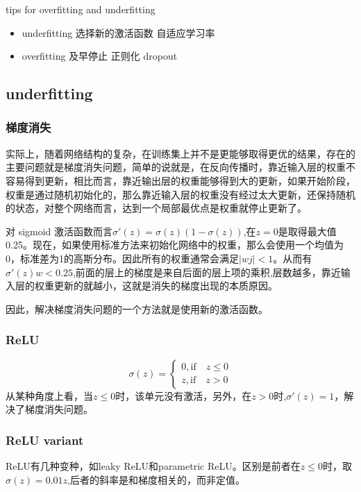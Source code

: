 \begin{myquotation}{tips for overfitting and underfitting}
	
\begin{itemize}
	\item underfitting
		\subitem	选择新的激活函数
		\subitem 	自适应学习率
	\item overfitting
		\subitem	及早停止
		\subitem	正则化
		\subitem	dropout 
\end{itemize}
	
\end{myquotation}

\subsection{underfitting}

\subsubsection{梯度消失}

实际上，随着网络结构的复杂，在训练集上并不是更能够取得更优的结果，存在的主要问题就是梯度消失问题，简单的说就是，在反向传播时，靠近输入层的权重不容易得到更新，相比而言，靠近输出层的权重能够得到大的更新，如果开始阶段，权重是通过随机初始化的，那么靠近输入层的权重没有经过太大更新，还保持随机的状态，对整个网络而言，达到一个局部最优点是权重就停止更新了。

对 sigmoid 激活函数而言$\sigma ' (z) = \sigma(z)(1-\sigma(z))$,在$z=0$是取得最大值0.25。现在，如果使用标准方法来初始化网络中的权重，那么会使用一个均值为0，标准差为1的高斯分布。因此所有的权重通常会满足$|wj|<1$。从而有$\sigma'(z)w < 0.25$,前面的层上的梯度是来自后面的层上项的乘积,层数越多，靠近输入层的权重更新的就越小，这就是消失的梯度出现的本质原因。

因此，解决梯度消失问题的一个方法就是使用新的激活函数。

\subsubsection{ReLU}
\begin{equation}
\sigma(z)=\begin{cases}
0,\mathrm{if}\quad z \leq 0\\
z,\mathrm{if} \quad z > 0
\end{cases}
\end{equation}
从某种角度上看，当$z\leq 0$时，该单元没有激活，另外，在$z >0 $时,$\sigma'(z)=1$，解决了梯度消失问题。
\subsubsection{ReLU variant}
ReLU有几种变种，如leaky ReLU和parametric ReLU。区别是前者在$z\leq 0$时，取$\sigma(z)=0.01z$,后者的斜率是和梯度相关的，而非定值。

